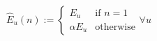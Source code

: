 \begin{equation}
	\hat{E}_u(n) :=
	\begin{cases}
		E_u &\text{if } n = 1\\
		\alpha E_u &\text{otherwise}
	\end{cases}
	\forall u
	\label{ch3:equ:intermediate-demand-energy}
\end{equation}
